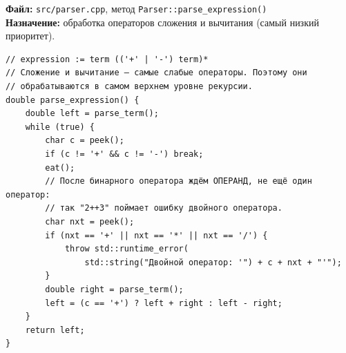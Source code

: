 



\noindent\textbf{Файл:} \texttt{src/parser.cpp}, метод \texttt{Parser::parse\_expression()}\\
\textbf{Назначение:} обработка операторов сложения и вычитания (самый низкий приоритет).

\begin{lstlisting}
// expression := term (('+' | '-') term)*
// Сложение и вычитание — самые слабые операторы. Поэтому они
// обрабатываются в самом верхнем уровне рекурсии.
double parse_expression() {
    double left = parse_term();
    while (true) {
        char c = peek();
        if (c != '+' && c != '-') break;
        eat();
        // После бинарного оператора ждём ОПЕРАНД, не ещё один оператор:
        // так "2++3" поймает ошибку двойного оператора.
        char nxt = peek();
        if (nxt == '+' || nxt == '*' || nxt == '/') {
            throw std::runtime_error(
                std::string("Двойной оператор: '") + c + nxt + "'");
        }
        double right = parse_term();
        left = (c == '+') ? left + right : left - right;
    }
    return left;
}
\end{lstlisting}


